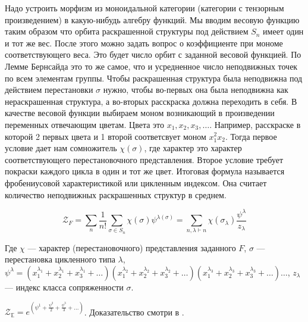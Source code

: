 Надо устроить морфизм из моноидальной
категории (категории с тензорным произведением) в какую-нибудь алгебру функций. Мы вводим весовую
функцию таким образом что орбита раскрашенной структуры под действием $S_n$ имеет один и тот же вес.
После этого можно задать вопрос о коэффициенте при мономе соответствующего веса.
Это будет число орбит с заданной весовой функцией. По Лемме Бернсайда это то же
самое, что и усредненное число неподвижных точек по всем элементам группы. Чтобы
раскрашенная структура была неподвижна под действием перестановки $\sigma$
нужно, чтобы во-первых она была неподвижна как нераскрашенная структура, а
во-вторых расскраска должна переходить в себя. В качестве
весовой функции выбираем моном возникающий в произведении переменных отвечающим
цветам. Цвета это $x_1, x_2, x_3, \dots$. Например, расскраске в которой 2
первых цвета и 1 второй соответсвует моном $x_1^2x_2$. Тогда первое условие дает нам сомножитель
$\chi(\sigma)$, где характер это характер соответствующего перестановочного
представления. Второе условие требует покраски каждого
цикла в один и тот же цвет. Итоговая формула называется фробениусовой
характеристикой или цикленным индексом. Она считает количество неподвижных
раскрашенных структур в среднем. 

\begin{statement}
\begin{equation}
\label{eq:fr}
\mathcal Z_F =
\sum_{n}\frac{1}{n!}\sum_{\sigma \in S_n}\chi(\sigma)\psi^{\lambda(\sigma)} =
\sum_{n, \lambda \vdash n}\chi(\sigma_{\lambda})
\frac{\psi^{\lambda}}{z_{\lambda}}
\end{equation}

Где $\chi$ --- характер (перестановочного) представления заданного $F$, $\sigma$
--- перестановка цикленного типа $\lambda$, 
$\psi^{\lambda} = 
(x_1^{\lambda_1} + x_2^{\lambda_1} + x_3^{\lambda_1} + \dots)
(x_1^{\lambda_2} + x_2^{\lambda_2} + x_3^{\lambda_2} + \dots)
(x_1^{\lambda_3} + x_2^{\lambda_3} + x_3^{\lambda_3} + \dots)
\dots$,
$z_\lambda$ --- индекс класса сопряженности $\sigma$.
\end{statement}

\begin{example}
$\mathcal Z_{\mathbb E} = e^{(\psi^1 + \frac{\psi^2}{2} + \frac{\psi^3}{3} +
\dots)}$. Доказательство смотри в \cite{BergTrees}.
\end{example}

